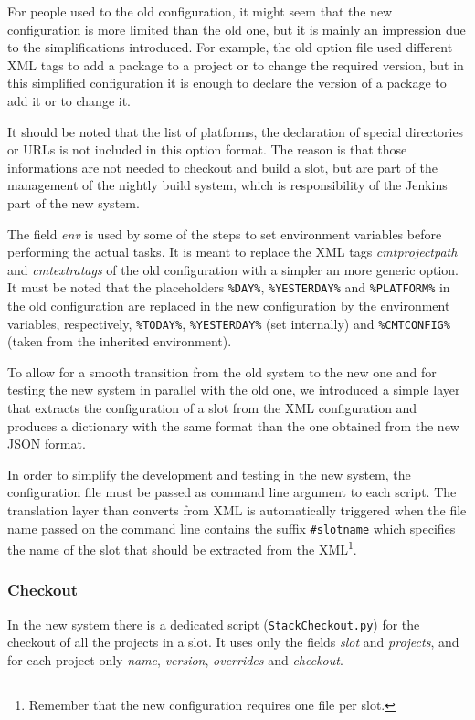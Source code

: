 \documentclass{lhcbnote}
\begin{document}
For people used to the old configuration, it might seem that the new
configuration is more limited than the old one, but it is mainly an impression
due to the simplifications introduced.  For example, the old option file used
different XML tags to add a package to a project or to change the required
version, but in this simplified configuration it is enough to declare the
version of a package to add it or to change it.

It should be noted that the list of platforms, the declaration of special
directories or URLs is not included in this option format.  The reason is that
those informations are not needed to checkout and build a slot, but are part of
the management of the nightly build system, which is responsibility of the
Jenkins part of the new system.

The field \emph{env} is used by some of the steps to set environment variables
before performing the actual tasks.  It is meant to replace the XML tags
\emph{cmtprojectpath} and \emph{cmtextratags} of the old configuration with a
simpler an more generic option.  It must be noted that the placeholders
\texttt{\%DAY\%}, \texttt{\%YESTERDAY\%} and \texttt{\%PLATFORM\%} in the old
configuration are replaced in the new configuration by the environment
variables, respectively, \texttt{\%TODAY\%}, \texttt{\%YESTERDAY\%} (set
internally) and \texttt{\%CMTCONFIG\%} (taken from the inherited environment).

To allow for a smooth transition from the old system to the new one and for
testing the new system in parallel with the old one, we introduced a simple
layer that extracts the configuration of a slot from the XML configuration and
produces a dictionary with the same format than the one obtained from the new
JSON format.

In order to simplify the development and testing in the new system, the
configuration file must be passed as command line argument to each script.  The
translation layer than converts from XML is automatically triggered when the
file name passed on the command line contains the suffix \texttt{\#slotname}
which specifies the name of the slot that should be extracted from the
XML\footnote{%
  Remember that the new configuration requires one file per slot.}.

\subsubsection{Checkout}
\label{CoreTools:CheckOut}
In the new system there is a dedicated script (\texttt{StackCheckout.py}) for
the checkout of all the projects in a slot.  It uses only the fields \emph{slot}
and \emph{projects}, and for each project only \emph{name}, \emph{version},
\emph{overrides} and \emph{checkout}.
\end{document}
